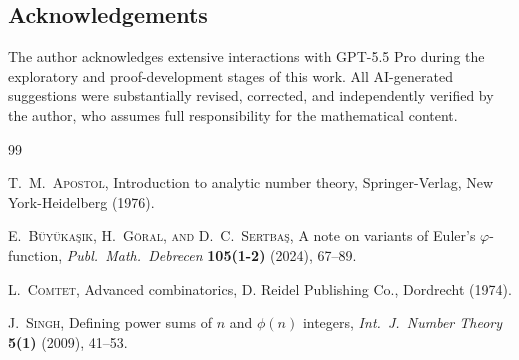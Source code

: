 \documentclass[12pt]{article}
\begin{document}
\subsection*{Acknowledgements}
The author acknowledges extensive interactions with 
 GPT-5.5 Pro during the exploratory and proof-development stages of this work. All AI-generated suggestions were substantially revised, corrected, and independently verified by the author, who assumes full responsibility for the mathematical content.

\begin{thebibliography}{99}

 \textsc{T.\ M.\ Apostol}, 
 Introduction to analytic number theory, 
 Springer-Verlag, New York-Heidelberg (1976). 

 \textsc{E.\ B\"{u}y\"{u}ka\c sik, H.\ G\"oral, and D.\ C.\ Sertba\c s}, 
 A note on variants of {E}uler's {$\varphi$}-function, 
 \emph{Publ.\ Math.\ Debrecen} {\bf 105(1-2)} (2024), 67--89. 

 \textsc{L.\ Comtet}, 
 Advanced combinatorics, 
 D. Reidel Publishing Co., Dordrecht (1974). 

 \textsc{J.\ Singh}, 
 Defining power sums of {$n$} and {$\phi(n)$} integers, 
 \emph{Int.\ J.\ Number Theory} {\bf 5(1)} (2009), 41--53. 
 
\end{thebibliography}

 
\end{document}
